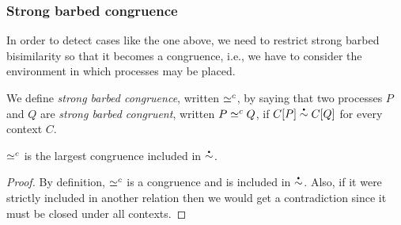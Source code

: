 




\subsubsection{Strong barbed congruence}
In order to detect cases like the one above, we need to restrict strong barbed bisimilarity so that it becomes a congruence,
i.e., %
we have to consider the environment in which processes may be placed.

We define \emph{strong barbed congruence}, written \( \simeq^c \), by saying that two processes \( P \) and \( Q \) are \emph{strong barbed congruent}, written \( P \simeq^c Q \), if \( \sbbisim{\applyctx{C}{P}}{\applyctx{C}{Q}} \) for every context \( C \).

\begin{lemma}
  \( \simeq^c \) is the largest congruence included in
  \( \sbbisim{}{} \).
\end{lemma}
\begin{proof}
  By definition, \( \simeq^c \) is a congruence and is included in
  \( \sbbisim{}{} \). Also, if it were strictly included in another
  relation then we would get a contradiction since it must be closed
  under all contexts.
\end{proof}

